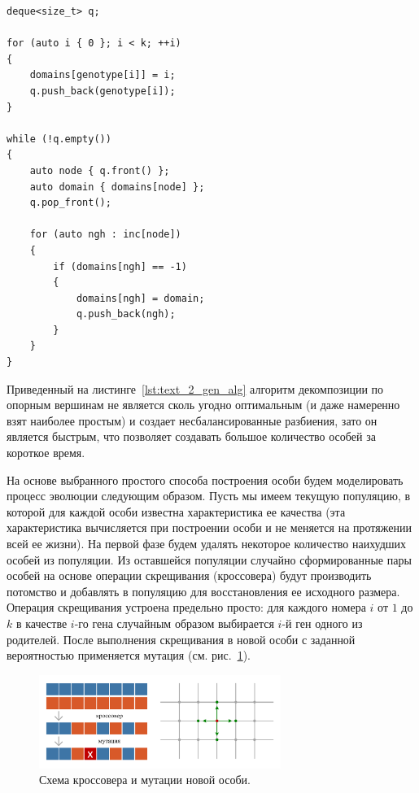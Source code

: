 \begin{singlespace}
\begin{lstlisting}[caption={Простая декомпозиция, используемая в генетическом алгоритме.},label={lst:text_2_gen_alg}]
deque<size_t> q;

for (auto i { 0 }; i < k; ++i)
{
    domains[genotype[i]] = i;
    q.push_back(genotype[i]);
}

while (!q.empty())
{
    auto node { q.front() };
    auto domain { domains[node] };
    q.pop_front();

    for (auto ngh : inc[node])
    {
        if (domains[ngh] == -1)
        {
            domains[ngh] = domain;
            q.push_back(ngh);
        }
    }
}
\end{lstlisting}
\end{singlespace}

Приведенный на листинге~\ref{lst:text_2_gen_alg} алгоритм декомпозиции по опорным вершинам не является сколь угодно оптимальным (и даже намеренно взят наиболее простым) и создает несбалансированные разбиения, зато он является быстрым, что позволяет создавать большое количество особей за короткое время.

На основе выбранного простого способа построения особи будем моделировать процесс эволюции следующим образом.
Пусть мы имеем текущую популяцию, в которой для каждой особи известна характеристика ее качества (эта характеристика вычисляется при построении особи и не меняется на протяжении всей ее жизни).
На первой фазе будем удалять некоторое количество наихудших особей из популяции.
Из оставшейся популяции случайно сформированные пары особей на основе операции скрещивания (кроссовера)\label{term:crossover} будут производить потомство и добавлять в популяцию для восстановления ее исходного размера.
Операция скрещивания устроена предельно просто: для каждого номера $i$ от $1$ до $k$ в качестве $i$-го гена случайным образом выбирается $i$-й ген одного из родителей.
После выполнения скрещивания в новой особи с заданной вероятностью применяется мутация (см. рис.~\ref{fig:text_2_genetic_cross_mut})\label{term:mutation}.

\begin{figure}[ht]
\centering
\includegraphics[width=0.7\textwidth]{./pics/text_2_genetic/cross-mut.pdf}
\singlespacing
{}\caption{Схема кроссовера и мутации новой особи.}
\label{fig:text_2_genetic_cross_mut}
\end{figure}

